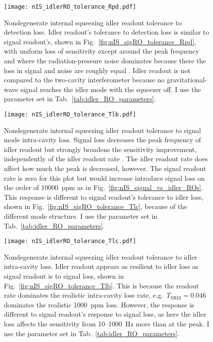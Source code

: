 \begin{figure}
    \centering
    \texttt{[image: nIS\_idlerRO\_tolerance\_Rpd.pdf]} 
    \caption{ Nondegenerate internal squeezing idler readout tolerance to detection loss. Idler readout's tolerance to detection loss is similar to signal readout's, shown in Fig.~\ref{fig:nIS_sigRO_tolerance_Rpd}, with uniform loss of sensitivity except around the peak frequency and where the radiation-pressure noise dominates because there the loss in signal and noise are roughly equal . Idler readout is not compared to the two-cavity interferometer because no gravitational-wave signal reaches the idler mode with the squeezer off. I use the parameter set in Tab.~\ref{tab:idler_RO_parameters}.}
    \label{fig:nIS_idlerRO_tolerance_Rpd}
\end{figure}
\begin{figure}
	\centering
	\texttt{[image: nIS\_idlerRO\_tolerance\_Tlb.pdf]}
	\caption{Nondegenerate internal squeezing idler readout tolerance to signal mode intra-cavity loss. Signal loss decreases the peak frequency of idler readout but strongly broadens the sensitivity improvement, independently of the idler readout rate . The idler readout rate does affect how much the peak is decreased, however. The signal readout rate is zero for this plot but would increase introduce signal loss on the order of 10000~ppm as in Fig.~\ref{fig:nIS_signal_vs_idler_ROs}. This response is different to signal readout's tolerance to idler loss, shown in Fig.~\ref{fig:nIS_sigRO_tolerance_Tlc}, because of the different mode structure. I use the parameter set in Tab.~\ref{tab:idler_RO_parameters}.}
	\label{fig:nIS_idlerRO_tolerance_Tlb}
\end{figure}
\begin{figure}
	\centering
	\texttt{[image: nIS\_idlerRO\_tolerance\_Tlc.pdf]}
	\caption{ Nondegenerate internal squeezing idler readout tolerance to idler intra-cavity loss. Idler readout appears as resilient to idler loss as signal readout is to signal loss, shown in Fig.~\ref{fig:nIS_sigRO_tolerance_Tlb}. This is because the readout rate dominates the realistic intra-cavity loss rate, e.g.\ $T_\text{SRM}=0.046$ dominates the realistic 1000~ppm loss. However, the response is different to signal readout's response to signal loss, as here the idler loss affects the sensitivity from 10--1000~Hz more than at the peak.  I use the parameter set in Tab.~\ref{tab:idler_RO_parameters}.}
	\label{fig:nIS_idlerRO_tolerance_Tlc}
\end{figure}
